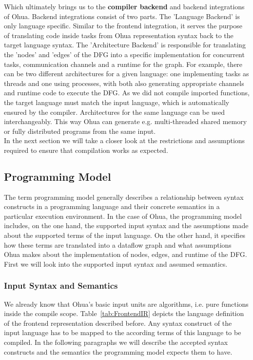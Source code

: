 Which ultimately brings us to the \textbf{compiler backend} and backend integrations of Ohua. Backend integrations consist of two parts. The 'Language Backend' is only language specific. Similar to the frontend integration, it serves the purpose of translating code inside tasks from Ohua representation syntax back to the target language syntax. The 'Architecture Backend' is responsible for translating the 'nodes' and 'edges' of the DFG into a specific implementation for concurrent tasks, communication channels and a runtime for the graph. For example, there can be two different architectures for a given language: one implementing tasks as threads and one using processes, with both also generating appropriate channels and runtime code to execute the DFG. As we did not compile imported functions, the target language must match the input language, which is automatically ensured by the compiler. Architectures for the same language can be used interchangeably. This way Ohua can generate e.g. multi-threaded shared memory or fully distributed programs from the same input.\\

In the next section we will take a closer look at the restrictions and assumptions required to ensure that compilation works as expected.

\subsection{Programming Model}

The term programming model generally describes a relationship between syntax constructs in a programming language and their concrete semantics in a particular execution environment. In the case of Ohua, the programming model includes, on the one hand, the supported input syntax and the assumptions made about the supported terms of the input language. On the other hand, it specifies how these terms are translated into a dataflow graph and what assumptions Ohua makes about the implementation of nodes, edges, and runtime of the DFG. First we will look into the supported input syntax and assumed semantics. 

\subsubsection{Input Syntax and Semantics}
We already know that Ohua's basic input units are algorithms, i.e. pure functions inside the compile scope. Table~\ref{tab:FrontendIR} depicts the language definition of the frontend representation described before. Any syntax construct of the input language has to be mapped to the according terms of this language to be compiled. In the following paragraphs we will describe the accepted syntax constructs and the semantics the programming model expects them to have. \\


